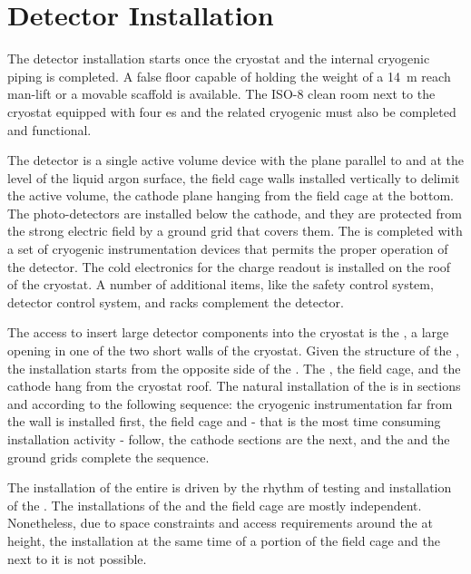 \section{Detector Installation}
\label{ch:dp-tc-installation}

The detector installation starts once the cryostat and the internal cryogenic piping is completed.
A false floor capable of holding the weight of a 14~m reach man-lift or a movable scaffold is available.
The ISO-8 clean room next to the cryostat equipped with four  \coldbox{}es and the related cryogenic must also be completed and functional.

The  detector is a single active volume device with the  plane parallel to and at the level of the liquid argon surface, the field cage walls installed vertically to delimit the active volume, the cathode plane hanging from the field cage at the bottom.
The photo-detectors are installed below the cathode, and they are protected from the strong electric field by a ground grid that covers them.
The  is completed with a set of cryogenic instrumentation devices that permits the proper operation of the detector.
The cold electronics for the charge readout is installed on the roof of the cryostat.
A number of additional items, like the safety control system, detector control system, and  racks complement the detector.

The access to insert large detector components into the cryostat is the , a large opening in one of the two short walls of the cryostat.
Given the structure of the , the installation starts from the opposite side of the .
The , the field cage, and the cathode hang from the cryostat roof.
The natural installation of the  is in sections and according to the following sequence: the cryogenic instrumentation far from the  wall is installed first,
the field cage and  - that is the most time consuming installation activity - follow, the cathode sections are the next, and the  and the ground grids complete the sequence.

The installation of the entire  is driven by the rhythm of testing and installation of the .
The installations of the  and the field cage are mostly independent.
Nonetheless, due to space constraints and access requirements around the  at height, the installation at the same time of a portion of the field cage and the  next to it is not possible.

